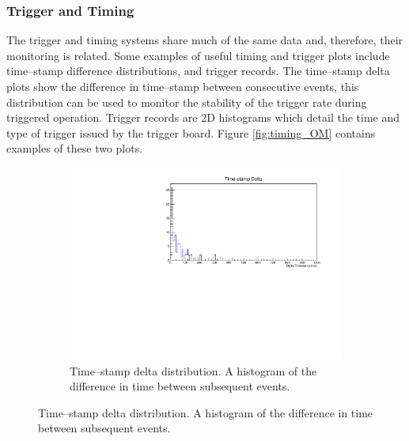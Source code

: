 \subsubsection*{Trigger and Timing}
The trigger and timing systems share much of the same data and, therefore, 
their monitoring is related. Some examples of useful timing and trigger plots 
include time--stamp difference distributions, and trigger records. The 
time--stamp delta plots show the difference in time--stamp between consecutive 
events, this distribution can be used to monitor the stability of the trigger 
rate during triggered operation. Trigger records are 2D histograms which 
detail the time and type of trigger issued by the trigger board. Figure 
\ref{fig:timing_OM} contains examples of these two plots.

\begin{figure}

	\centering

	\begin{subfigure}[b]{0.8\textwidth}
		\centering
		\vspace{3mm}
		\includegraphics[width=\textwidth]{figures/timestamp_delta.pdf}
		\caption {Time--stamp delta distribution. A histogram of the difference in time
		between subsequent events.}
		\label{fig:timestamp_delta}
	\end{subfigure}


\end{figure}
